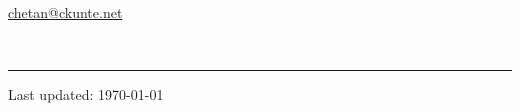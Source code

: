 \documentclass[10pt]{article}
\begin{document}
  \begin{flushleft}
    \textrm{\LARGE{\theauthor}} \\
    \href{mailto:chetan@ckunte.net}{chetan@ckunte.net} \hfill
  \end{flushleft}

  

  ~\hrule

  \begin{multicols}{2}


  \end{multicols}

  \vfill{}

  \begin{center}
    \scriptsize{Last updated: \today} %
  \end{center}
\end{document}
